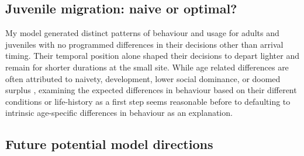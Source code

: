 \subsection*{Juvenile migration: naive or optimal?}

My model generated distinct patterns of behaviour and usage for adults and juveniles with no programmed differences in their decisions other than arrival timing. Their temporal position alone shaped their decisions to depart lighter and remain for shorter durations at the small site. While age related differences are often attributed to naivety, development, lower social dominance, or doomed surplus \citep{newton2010migration}, examining the expected differences in behaviour based on their different conditions or life-history as a first step seems reasonable before to defaulting to intrinsic age-specific differences in behaviour as an explanation. 






\subsection*{Future potential model directions}

